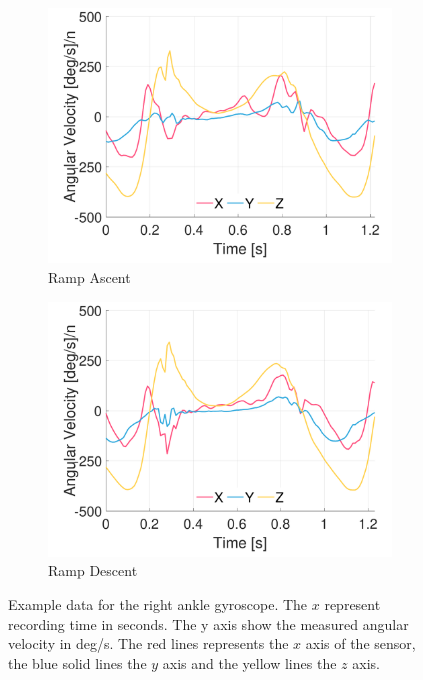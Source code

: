 \begin{figure}[p]
    \begin{subfigure}[b]{0.49\textwidth}
         \centering
         \includegraphics[width=\textwidth]{content/3-Methods/example-data/ch3_example_data_subject_01_r_ankle_gyro_activity_ramp_up.pdf}
         \caption{Ramp Ascent}
    \end{subfigure}
    \begin{subfigure}[b]{0.49\textwidth}
         \centering
         \includegraphics[width=\textwidth]{content/3-Methods/example-data/ch3_example_data_subject_01_r_ankle_gyro_activity_ramp_down.pdf}
         \caption{Ramp Descent}
    \end{subfigure}
    \caption[Example right ankle gyroscope data]{Example data for the right ankle gyroscope. The $x$ represent recording time in seconds. The y axis show the measured angular velocity in deg/s. The red lines represents the $x$ axis of the sensor, the blue solid lines the $y$ axis and the yellow lines the $z$ axis.}
    \label{fig:example-right-ankle-gyro-sensor-data}
\end{figure}


